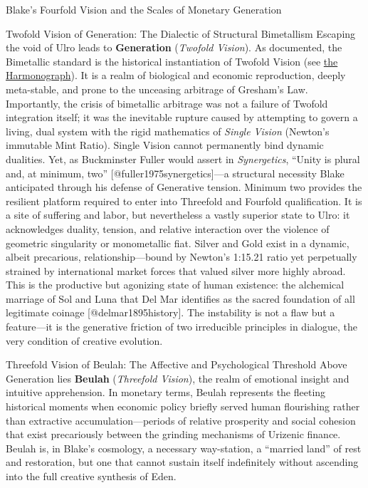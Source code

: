\documentclass[
  ignorenonframetext,
]{beamer}
\begin{document}
\begin{frame}{Blake's Fourfold Vision and the Scales of Monetary
Generation}
\begin{block}{Twofold Vision of Generation: The Dialectic of Structural
Bimetallism}
\protect{}\label{twofold-vision-of-generation-the-dialectic-of-structural-bimetallism}
Escaping the void of Ulro leads to \textbf{Generation} (\emph{Twofold
Vision}). As documented, the Bimetallic standard is the historical
instantiation of Twofold Vision (see \hyperlink{fig-alchemy}{the
Harmonograph}). It is a realm of biological and economic reproduction,
deeply meta-stable, and prone to the unceasing arbitrage of Gresham's
Law. Importantly, the crisis of bimetallic arbitrage was not a failure
of Twofold integration itself; it was the inevitable rupture caused by
attempting to govern a living, dual system with the rigid mathematics of
\emph{Single Vision} (Newton's immutable Mint Ratio). Single Vision
cannot permanently bind dynamic dualities. Yet, as Buckminster Fuller
would assert in \emph{Synergetics}, ``Unity is plural and, at minimum,
two'' {[}@fuller1975synergetics{]}---a structural necessity Blake
anticipated through his defense of Generative tension. Minimum two
provides the resilient platform required to enter into Threefold and
Fourfold qualification. It is a site of suffering and labor, but
nevertheless a vastly superior state to Ulro: it acknowledges duality,
tension, and relative interaction over the violence of geometric
singularity or monometallic fiat. Silver and Gold exist in a dynamic,
albeit precarious, relationship---bound by Newton's 1:15.21 ratio yet
perpetually strained by international market forces that valued silver
more highly abroad. This is the productive but agonizing state of human
existence: the alchemical marriage of Sol and Luna that Del Mar
identifies as the sacred foundation of all legitimate coinage
{[}@delmar1895history{]}. The instability is not a flaw but a
feature---it is the generative friction of two irreducible principles in
dialogue, the very condition of creative evolution.
\end{block}

\begin{block}{Threefold Vision of Beulah: The Affective and
Psychological Threshold}
\protect{}\label{threefold-vision-of-beulah-the-affective-and-psychological-threshold}
Above Generation lies \textbf{Beulah} (\emph{Threefold Vision}), the
realm of emotional insight and intuitive apprehension. In monetary
terms, Beulah represents the fleeting historical moments when economic
policy briefly served human flourishing rather than extractive
accumulation---periods of relative prosperity and social cohesion that
exist precariously between the grinding mechanisms of Urizenic finance.
Beulah is, in Blake's cosmology, a necessary way-station, a ``married
land'' of rest and restoration, but one that cannot sustain itself
indefinitely without ascending into the full creative synthesis of Eden.
\end{block}


\end{frame}
\end{document}
